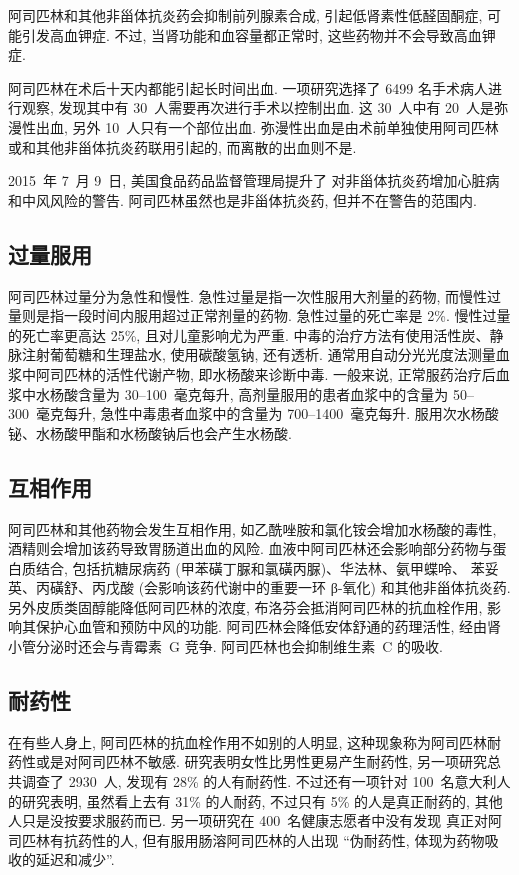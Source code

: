 阿司匹林和其他非甾体抗炎药会抑制前列腺素合成,
引起低肾素性低醛固酮症, 可能引发高血钾症.
不过, 当肾功能和血容量都正常时,
这些药物并不会导致高血钾症.

阿司匹林在术后十天内都能引起长时间出血.
一项研究选择了 \num{6499} 名手术病人进行观察,
发现其中有 30~人需要再次进行手术以控制出血.
这 30~人中有 20~人是弥漫性出血, 另外 10~人只有一个部位出血.
弥漫性出血是由术前单独使用阿司匹林或和其他非甾体抗炎药联用引起的,
而离散的出血则不是.

2015~年 7~月 9~日,
美国食品药品监督管理局提升了%
对非甾体抗炎药增加心脏病和中风风险的警告.
阿司匹林虽然也是非甾体抗炎药, 但并不在警告的范围内.

\subsection{过量服用}

阿司匹林过量分为急性和慢性.
急性过量是指一次性服用大剂量的药物,
而慢性过量则是指一段时间内服用超过正常剂量的药物.
急性过量的死亡率是 2\%.
慢性过量的死亡率更高达 25\%, 且对儿童影响尤为严重.
中毒的治疗方法有使用活性炭、静脉注射葡萄糖和生理盐水,
使用碳酸氢钠, 还有透析.
通常用自动分光光度法测量血浆中阿司匹林的活性代谢产物,
即水杨酸来诊断中毒.
一般来说, 正常服药治疗后血浆中水杨酸含量为 30--100~毫克每升,
高剂量服用的患者血浆中的含量为 50--300~毫克每升,
急性中毒患者血浆中的含量为 700--\num{1400}~毫克每升.
服用次水杨酸铋、水杨酸甲酯和水杨酸钠后也会产生水杨酸.

\subsection{互相作用}

阿司匹林和其他药物会发生互相作用,
如乙酰唑胺和氯化铵会增加水杨酸的毒性,
酒精则会增加该药导致胃肠道出血的风险.
血液中阿司匹林还会影响部分药物与蛋白质结合,
包括抗糖尿病药 (甲苯磺丁脲和氯磺丙脲)、华法林、氨甲蝶呤、%
苯妥英、丙磺舒、丙戊酸 (会影响该药代谢中的重要一环 β-氧化)
和其他非甾体抗炎药.
另外皮质类固醇能降低阿司匹林的浓度,
布洛芬会抵消阿司匹林的抗血栓作用,
影响其保护心血管和预防中风的功能.
阿司匹林会降低安体舒通的药理活性,
经由肾小管分泌时还会与青霉素~G 竞争.
阿司匹林也会抑制维生素~C 的吸收.

\subsection{耐药性}

在有些人身上, 阿司匹林的抗血栓作用不如别的人明显,
这种现象称为阿司匹林耐药性或是对阿司匹林不敏感.
研究表明女性比男性更易产生耐药性,
另一项研究总共调查了 \num{2930}~人,
发现有 28\% 的人有耐药性.
不过还有一项针对 100~名意大利人的研究表明,
虽然看上去有 31\% 的人耐药,
不过只有 5\% 的人是真正耐药的,
其他人只是没按要求服药而已.
另一项研究在 400~名健康志愿者中没有发现%
真正对阿司匹林有抗药性的人,
但有服用肠溶阿司匹林的人出现
``伪耐药性, 体现为药物吸收的延迟和减少''.

